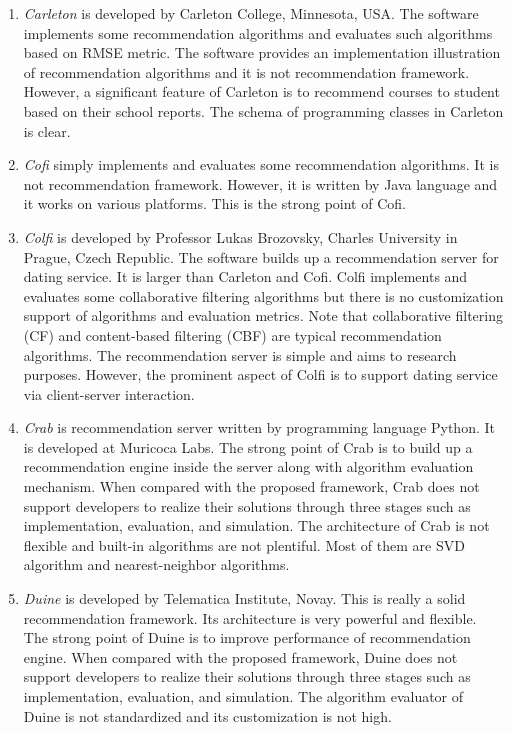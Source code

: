 \documentclass[a4paper,twoside]{article}
\begin{document}
\begin{enumerate}
\item \textit{Carleton} \cite{carleton} is developed by Carleton College, Minnesota, USA. The software implements some recommendation algorithms and evaluates such algorithms based on RMSE metric. The software provides an implementation illustration of recommendation algorithms and it is not recommendation framework. However, a significant feature of Carleton is to recommend courses to student based on their school reports. The schema of programming classes in Carleton is clear.
\item \textit{Cofi} \cite{cofi} simply implements and evaluates some recommendation algorithms. It is not recommendation framework. However, it is written by Java language \cite{oracle2014java} and it works on various platforms. This is the strong point of Cofi.
\item \textit{Colfi} \cite{colfi} is developed by Professor Lukas Brozovsky, Charles University in Prague, Czech Republic. The software builds up a recommendation server for dating service. It is larger than Carleton and Cofi. Colfi implements and evaluates some collaborative filtering algorithms but there is no customization support of algorithms and evaluation metrics. Note that collaborative filtering (CF) and content-based filtering (CBF) are typical recommendation algorithms. The recommendation server is simple and aims to research purposes. However, the prominent aspect of Colfi is to support dating service via client-server interaction.
\item \textit{Crab} \cite{crab} is recommendation server written by programming language Python. It is developed at Muricoca Labs. The strong point of Crab is to build up a recommendation engine inside the server along with algorithm evaluation mechanism. When compared with the proposed framework, Crab does not support developers to realize their solutions through three stages such as implementation, evaluation, and simulation. The architecture of Crab is not flexible and built-in algorithms are not plentiful. Most of them are SVD algorithm and nearest-neighbor algorithms.
\item \textit{Duine} \cite{duine} is developed by Telematica Institute, Novay. This is really a solid recommendation framework. Its architecture is very powerful and flexible. The strong point of Duine is to improve performance of recommendation engine. When compared with the proposed framework, Duine does not support developers to realize their solutions through three stages such as implementation, evaluation, and simulation. The algorithm evaluator of Duine is not standardized and its customization is not high.

\end{enumerate}
\end{document}
